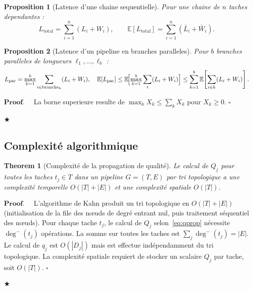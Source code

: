 \documentclass[12pt]{article}
\newtheorem{theorem}{Theorem}[section]
\newtheorem{proposition}{Proposition}[section]
\newenvironment{proof}{$\mathbf{Proof.\quad}$}{\begin{flushright}$\bigstar$\end{flushright}}
\newcommand{\E}{\mathbb{E}}
\begin{document}
\begin{proposition}[Latence d'une chaine sequentielle]
	\label{prop:latency_chain}
	Pour une chaine de $n$ taches dependantes :
	\begin{equation}
		L_{\text{total}} = \sum_{i=1}^n (L_i + W_i),
		\qquad
		\E[L_{\text{total}}] = \sum_{i=1}^n (\bar L_i + \bar W_i).
		\label{eq:latency}
	\end{equation}
\end{proposition}

\begin{proposition}[Latence d'un pipeline en branches paralleles]
	\label{prop:latency_parallel}
	Pour $b$ branches paralleles de longueurs $\ell_1,\ldots,\ell_b$ :
	\begin{equation}
		L_{\text{par}} = \max_{k=1}^b \sum_{i \in \text{branche}_k} (L_i + W_i),
		\quad
		\E[L_{\text{par}}]
		\leq \E\!\Bigl[\max_{k=1}^b \sum_{i} (L_i+W_i)\Bigr]
		\leq \sum_{k=1}^b \E\!\left[\sum_{i\in k}(L_i+W_i)\right].
		\label{eq:latency_par}
	\end{equation}
\end{proposition}

\begin{proof}
	La borne superieure resulte de $\max_k X_k \leq \sum_k X_k$
	pour $X_k \geq 0$. \hfill$\square$
\end{proof}

\subsection{Complexité algorithmique}
\label{subsec:complexity}

\begin{theorem}[Complexité de la propagation de qualité]
	\label{thm:complexity}
	Le calcul de $Q_j$ pour toutes les taches $t_j \in T$ dans un pipeline
	$G=(T,E)$ par tri topologique a une complexité temporelle $O(|T|+|E|)$
	et une complexité spatiale $O(|T|)$.
\end{theorem}

\begin{proof}
	L'algorithme de Kahn produit un tri topologique en $O(|T|+|E|)$
	(initialisation de la file des nœuds de degré entrant nul, puis
	traitement séquentiel des nœuds). Pour chaque tache $t_j$, le calcul
	de $Q_j$ selon~\eqref{eq:qprop} nécessite $\deg^{-}(t_j)$ opérations.
	La somme sur toutes les taches est
	$\sum_{j} \deg^{-}(t_j) = |E|$. Le calcul de $q_j$ est $O(|D_j|)$
	mais est effectue indépendamment du tri topologique.
	La complexité spatiale requiert de stocker un scalaire $Q_j$ par tache,
	soit $O(|T|)$. \hfill$\square$
\end{proof}
\end{document}
